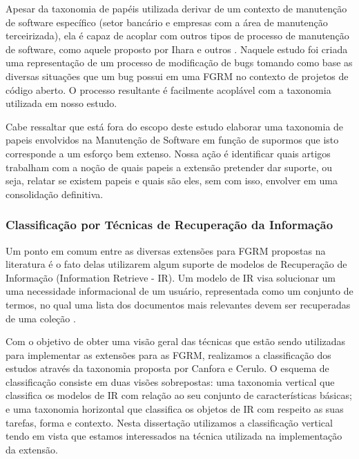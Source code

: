 Apesar da taxonomia de papéis utilizada derivar de um contexto de manutenção de software específico
(setor bancário e empresas com a área de manutenção terceirizada), ela é capaz de acoplar com outros
tipos de processo de manutenção de software, como aquele proposto por Ihara e outros
\cite{Ihara:2009:AMI:1595808.1595833}. Naquele estudo foi criada uma representação de um processo
de modificação de bugs tomando como base as diversas situações que um bug possui em uma FGRM no contexto de projetos de código aberto. O processo resultante é facilmente acoplável com a taxonomia utilizada em
nosso estudo.

Cabe ressaltar que está fora do escopo deste estudo elaborar uma taxonomia de papeis envolvidos na
Manutenção de Software em função de supormos que isto corresponde a um esforço bem extenso. Nossa
ação é identificar quais artigos trabalham com a noção de quais papeis a extensão pretender dar
suporte,  ou seja,  relatar se existem papeis e quais são eles,  sem com isso, envolver em uma
consolidação definitiva.

\subsubsection{Classificação por Técnicas de Recuperação da Informação}
\label{subsubsec:map-esaquema-tecnicas-ir}

Um ponto em comum entre as diversas extensões para FGRM propostas na literatura é o fato delas utilizarem algum suporte de modelos de Recuperação de Informação (Information Retrieve - IR). Um modelo de IR visa solucionar um uma necessidade informacional de um usuário, representada como um conjunto de termos, no qual uma lista dos documentos mais relevantes devem ser recuperadas de uma coleção \cite{baeza1999modern}. 

Com o objetivo de obter uma visão geral das técnicas que estão sendo utilizadas para implementar as
extensões para as FGRM, realizamos a classificação dos estudos através da taxonomia proposta por
Canfora e Cerulo\cite{cerulo2004taxonomy}. O esquema de classificação consiste em duas visões
sobrepostas: uma taxonomia vertical que classifica os modelos de IR com relação ao seu conjunto
de características básicas; e uma taxonomia horizontal que classifica os objetos de IR com respeito
as suas tarefas, forma e contexto\cite{cerulo2004taxonomy}. Nesta dissertação utilizamos a
classificação vertical tendo em vista que estamos interessados na técnica utilizada na implementação da extensão.

